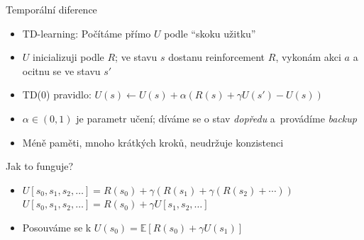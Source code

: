 \documentclass{beamer}
\begin{document}
\begin{frame}{Temporální diference}
\begin{itemize}
\item TD-learning: Počítáme přímo $U$ podle ``skoku užitku''
\item $U$ inicializuji podle $R$; ve stavu $s$ dostanu reinforcement $R$, vykonám akci $a$ a ocitnu se ve stavu $s'$
\item TD(0) pravidlo: $U(s) \leftarrow U(s) + \alpha(R(s) + \gamma U(s') - U(s))$
\item $\alpha \in (0,1)$ je parametr učení; díváme se o stav {\em dopředu} a~provádíme {\em backup}
\item Méně paměti, mnoho krátkých kroků, neudržuje konzistenci
\end{itemize}
\begin{block}{Jak to funguje?}
\begin{itemize}
\item $U[s_0,s_1,s_2,\ldots] = R(s_0) + \gamma(R(s_1) + \gamma(R(s_2) + \cdots))$ \\
	$U[s_0,s_1,s_2,\ldots] = R(s_0) + \gamma U[s_1,s_2,\ldots]$
\item Posouváme se k $U(s_0) = \mathbb{E}[R(s_0) + \gamma U(s_1)]$
\end{itemize}
\end{block}
\end{frame}

\subsection{}
\end{document}
